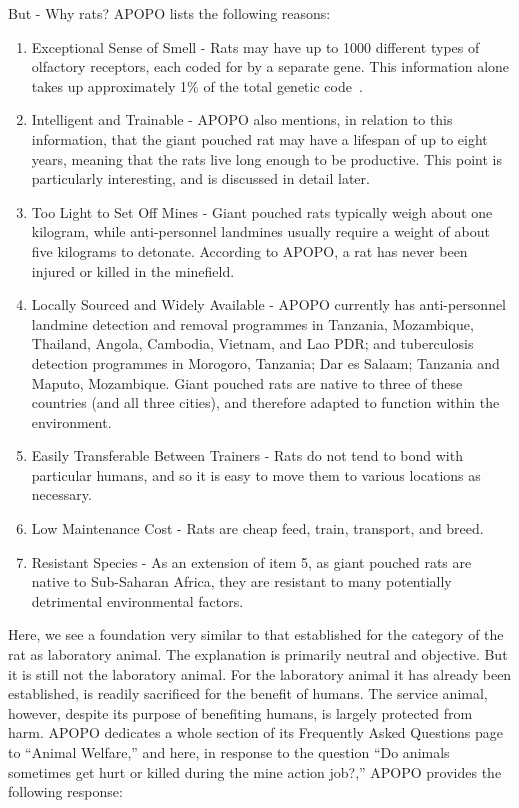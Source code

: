 \documentclass[12pt]{article}
\begin{document}
But - Why rats? APOPO lists the following reasons:
\begin{enumerate}
\item Exceptional Sense of Smell - Rats may have up to 1000 different types of olfactory receptors, each coded for by a separate gene. This information alone takes up approximately 1\% of the total genetic code~\cite{Hanson2012}.
\item Intelligent and Trainable - APOPO also mentions, in relation to this information, that the giant pouched rat may have a lifespan of up to eight years, meaning that the rats live long enough to be productive. This point is particularly interesting, and is discussed in detail later.
\item Too Light to Set Off Mines - Giant pouched rats typically weigh about one kilogram, while anti-personnel landmines usually require a weight of about five kilograms to detonate. According to APOPO, a rat has never been injured or killed in the minefield.
\item Locally Sourced and Widely Available - APOPO currently has anti-personnel landmine detection and removal programmes in Tanzania, Mozambique, Thailand, Angola, Cambodia, Vietnam, and Lao PDR; and tuberculosis detection programmes in Morogoro, Tanzania; Dar es Salaam; Tanzania and Maputo, Mozambique. Giant pouched rats are native to three of these countries (and all three cities), and therefore adapted to function within the environment.
\item Easily Transferable Between Trainers - Rats do not tend to bond with particular humans, and so it is easy to move them to various locations as necessary.
\item Low Maintenance Cost - Rats are cheap feed, train, transport, and breed.
\item Resistant Species - As an extension of item 5, as giant pouched rats are native to Sub-Saharan Africa, they are resistant to many potentially detrimental environmental factors.
\end{enumerate}

Here, we see a foundation very similar to that established for the category of the rat as laboratory animal. The explanation is primarily neutral and objective. But it is still not the laboratory animal. For the laboratory animal it has already been established, is readily sacrificed for the benefit of humans. The service animal, however, despite its purpose of benefiting humans, is largely protected from harm. APOPO dedicates a whole section of its Frequently Asked Questions page to ``Animal Welfare,'' and here, in response to the question ``Do animals sometimes get hurt or killed during the mine action job?,'' APOPO provides the following response:
\end{document}
